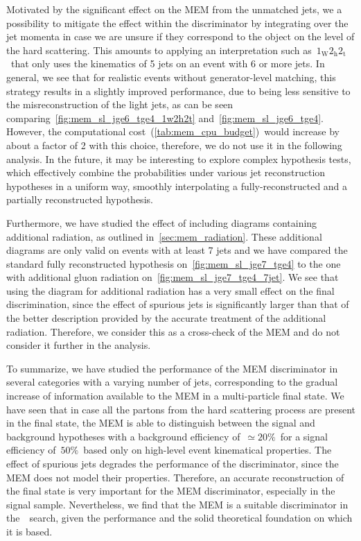Motivated by the significant effect on the MEM from the unmatched jets, we a possibility to mitigate the effect within the discriminator by integrating over the jet momenta in case we are unsure if they correspond to the object on the level of the hard scattering. This amounts to applying an interpretation such as~$1_{\mathrm{W}} 2_{\mathrm{h}} 2_{\mathrm{t}}$~that only uses the kinematics of 5 jets on an event with 6 or more jets. In general, we see that for realistic events without generator-level matching, this strategy results in a slightly improved performance, due to being less sensitive to the misreconstruction of the light jets, as can be seen comparing~\cref{fig:mem_sl_jge6_tge4_1w2h2t} and~\cref{fig:mem_sl_jge6_tge4}. However, the computational cost~(\cref{tab:mem_cpu_budget})~would increase by about a factor of 2 with this choice, therefore, we do not use it in the following analysis. In the future, it may be interesting to explore complex hypothesis tests, which effectively combine the probabilities under various jet reconstruction hypotheses in a uniform way, smoothly interpolating a fully-reconstructed and a partially reconstructed hypothesis.

Furthermore, we have studied the effect of including diagrams containing additional radiation, as outlined in~\cref{sec:mem_radiation}. These additional diagrams are only valid on events with at least 7 jets and we have compared the standard fully reconstructed hypothesis on~\cref{fig:mem_sl_jge7_tge4} to the one with additional gluon radiation on~\cref{fig:mem_sl_jge7_tge4_7jet}. We see that using the diagram for additional radiation has a very small effect on the final discrimination, since the effect of spurious jets is significantly larger than that of the better description provided by the accurate treatment of the additional radiation. Therefore, we consider this as a cross-check of the MEM and do not consider it further in the analysis.

To summarize, we have studied the performance of the MEM discriminator in several categories with a varying number of jets, corresponding to the gradual increase of information available to the MEM in a multi-particle final state. We have seen that in case all the partons from the hard scattering process are present in the final state, the MEM is able to distinguish between the signal and background hypotheses with a background efficiency of~$\simeq 20\%$~for a signal efficiency of~$50\%$~based only on high-level event kinematical properties. The effect of spurious jets degrades the performance of the discriminator, since the MEM does not model their properties. Therefore, an accurate reconstruction of the final state is very important for the MEM discriminator, especially in the signal sample. Nevertheless, we find that the MEM is a suitable discriminator in the~\ttHbb~search, given the performance and the solid theoretical foundation on which it is based.

